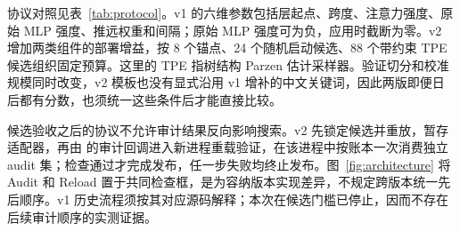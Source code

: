 协议对照见表~\ref{tab:protocol}。v1 的六维参数包括层起点、跨度、注意力强度、原始 MLP 强度、推远权重和间隔；原始 MLP 强度可为负，应用时截断为零。v2 增加两类组件的部署增益，按 8 个锚点、24 个随机启动候选、88 个带约束 TPE 候选组织固定预算。这里的 TPE 指树结构 Parzen 估计采样器。验证切分和校准规模同时改变，v2 模板也没有显式沿用 v1 增补的中文关键词，因此两版即便日后都有分数，也须统一这些条件后才能直接比较。



候选验收之后的协议不允许审计结果反向影响搜索。v2 先锁定候选并重放，暂存适配器，再由  的审计回调进入新进程重载验证，在该进程中按账本一次消费独立 audit 集；检查通过才完成发布，任一步失败均终止发布。图~\ref{fig:architecture} 将 Audit 和 Reload 置于共同检查框，是为容纳版本实现差异，不规定跨版本统一先后顺序。v1 历史流程须按其对应源码解释；本次在候选门槛已停止，因而不存在后续审计顺序的实测证据。
